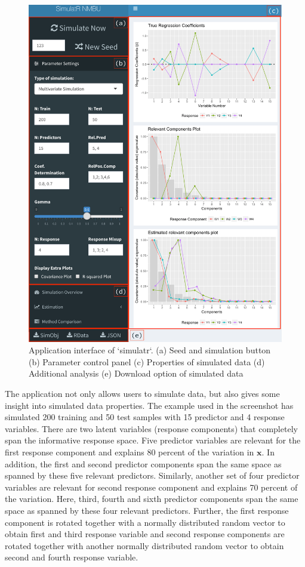 \documentclass[review]{elsarticle}
\theoremstyle{definition}
\theoremstyle{definition}
\theoremstyle{remark}
\begin{document}
\begin{figure}[!htb]

{\centering \includegraphics[width=0.95\linewidth]{images/AppSimulatr} 

}

\caption{Application interface of `simulatr`. (a) Seed and simulation button (b) Parameter control panel (c) Properties of simulated data (d) Additional analysis (e) Download option of simulated data}\label{fig:AppSimulatr}
\end{figure}

The application not only allows users to simulate data, but also gives
some insight into simulated data properties. The example used in the
screenshot has simulated 200 training and 50 test samples with 15
predictor and 4 response variables. There are two latent variables
(response components) that completely span the informative response
space. Five predictor variables are relevant for the first response
component and explains 80 percent of the variation in \(\mathbf{x}\). In
addition, the first and second predictor components span the same space
as spanned by these five relevant predictors. Similarly, another set of
four predictor variables are relevant for second response component and
explains 70 percent of the variation. Here, third, fourth and sixth
predictor components span the same space as spanned by these four
relevant predictors. Further, the first response component is rotated
together with a normally distributed random vector to obtain first and
third response variable and second response components are rotated
together with another normally distributed random vector to obtain
second and fourth response variable.
\end{document}
